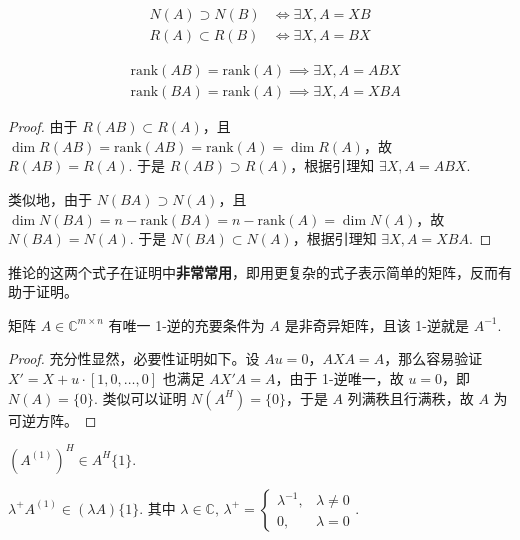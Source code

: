 \begin{lemma}
\begin{align*}
    N(A)\supset N(B)&\iff \exists X,A=XB\\
    R(A)\subset R(B)&\iff \exists X,A=BX
\end{align*}
\end{lemma}

\begin{corollary}
\label{cor:rankAB}
\begin{align*}
    &\text{rank}(AB)=\text{rank}(A)\implies \exists X,A=ABX\\
    &\text{rank}(BA)=\text{rank}(A)\implies \exists X,A=XBA
\end{align*}
\end{corollary}
\begin{proof}
由于 $R(AB)\subset R(A)$，且 $\dim R(AB)=\text{rank}(AB)=\text{rank}(A)=\dim R(A)$，故 $R(AB)=R(A)$.  于是 $R(AB)\supset R(A)$，根据引理知 $\exists X,A=ABX$.

类似地，由于 $N(BA)\supset N(A)$，且 $\dim N(BA)=n-\text{rank}(BA)=n-\text{rank}(A)=\dim N(A)$，故 $N(BA)=N(A)$.  于是 $N(BA)\subset N(A)$，根据引理知 $\exists X,A=XBA$.
\end{proof}

\begin{remark}
推论的这两个式子在证明中\textbf{非常常用}，即用更复杂的式子表示简单的矩阵，反而有助于证明。
\end{remark}

\begin{theorem}
矩阵 $A\in\mathbb C^{m\times n}$ 有唯一 1-逆的充要条件为 $A$ 是非奇异矩阵，且该 1-逆就是 $A^{-1}$.
\end{theorem}
\begin{proof}
充分性显然，必要性证明如下。设 $Au=0$，$AXA=A$，那么容易验证 $X'=X+u\cdot[1,0,\ldots,0]$ 也满足 $AX'A=A$，由于 1-逆唯一，故 $u=0$，即 $N(A)=\{0\}$.  类似可以证明 $N(A^H)=\{0\}$，于是 $A$ 列满秩且行满秩，故 $A$ 为可逆方阵。
\end{proof}

\begin{property}[1]
$(A^{(1)})^H\in A^{H}\{1\}$.
\end{property}

\begin{property}[2]
$\lambda^+ A^{(1)}\in(\lambda A)\{1\}$. 其中 $\lambda\in\mathbb C,\,\lambda^{+}=\begin{cases}\lambda^{-1},&\lambda\neq 0\\0,&\lambda=0\end{cases}$.
\end{property}

